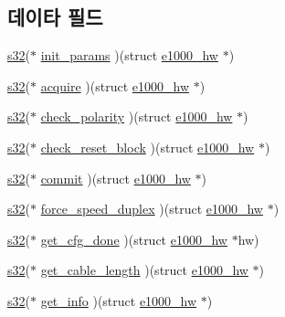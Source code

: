 \subsection*{데이타 필드}
\begin{DoxyCompactItemize}
\item 
\hyperlink{lib_2igb_2e1000__osdep_8h_ae9b1af5c037e57a98884758875d3a7c4}{s32}($\ast$ \hyperlink{structe1000__phy__operations_a9697a81cd453237323e05ff88409b12e}{init\+\_\+params} )(struct \hyperlink{structe1000__hw}{e1000\+\_\+hw} $\ast$)
\item 
\hyperlink{lib_2igb_2e1000__osdep_8h_ae9b1af5c037e57a98884758875d3a7c4}{s32}($\ast$ \hyperlink{structe1000__phy__operations_a8509a9e3db6050cb00cecc1a855a70ed}{acquire} )(struct \hyperlink{structe1000__hw}{e1000\+\_\+hw} $\ast$)
\item 
\hyperlink{lib_2igb_2e1000__osdep_8h_ae9b1af5c037e57a98884758875d3a7c4}{s32}($\ast$ \hyperlink{structe1000__phy__operations_adf880b61cb2c5833fbb8e01e8d277fde}{check\+\_\+polarity} )(struct \hyperlink{structe1000__hw}{e1000\+\_\+hw} $\ast$)
\item 
\hyperlink{lib_2igb_2e1000__osdep_8h_ae9b1af5c037e57a98884758875d3a7c4}{s32}($\ast$ \hyperlink{structe1000__phy__operations_a7803e367ac5c93cfef01ab5b87b0faf4}{check\+\_\+reset\+\_\+block} )(struct \hyperlink{structe1000__hw}{e1000\+\_\+hw} $\ast$)
\item 
\hyperlink{lib_2igb_2e1000__osdep_8h_ae9b1af5c037e57a98884758875d3a7c4}{s32}($\ast$ \hyperlink{structe1000__phy__operations_aa09068659dd86c6ac8c8eaf206c848b4}{commit} )(struct \hyperlink{structe1000__hw}{e1000\+\_\+hw} $\ast$)
\item 
\hyperlink{lib_2igb_2e1000__osdep_8h_ae9b1af5c037e57a98884758875d3a7c4}{s32}($\ast$ \hyperlink{structe1000__phy__operations_ab64c7048c4bdefd4c8b2d7a2ef740fa7}{force\+\_\+speed\+\_\+duplex} )(struct \hyperlink{structe1000__hw}{e1000\+\_\+hw} $\ast$)
\item 
\hyperlink{lib_2igb_2e1000__osdep_8h_ae9b1af5c037e57a98884758875d3a7c4}{s32}($\ast$ \hyperlink{structe1000__phy__operations_a0b4b4b03c09f1cf6f965ce87c2603ddf}{get\+\_\+cfg\+\_\+done} )(struct \hyperlink{structe1000__hw}{e1000\+\_\+hw} $\ast$hw)
\item 
\hyperlink{lib_2igb_2e1000__osdep_8h_ae9b1af5c037e57a98884758875d3a7c4}{s32}($\ast$ \hyperlink{structe1000__phy__operations_a5aefa6c2cf34fccb05ae967035ddcbb2}{get\+\_\+cable\+\_\+length} )(struct \hyperlink{structe1000__hw}{e1000\+\_\+hw} $\ast$)
\item 
\hyperlink{lib_2igb_2e1000__osdep_8h_ae9b1af5c037e57a98884758875d3a7c4}{s32}($\ast$ \hyperlink{structe1000__phy__operations_a06c5e946bbaf7e58c07cf9cdf4693d86}{get\+\_\+info} )(struct \hyperlink{structe1000__hw}{e1000\+\_\+hw} $\ast$)

\end{DoxyCompactItemize}
